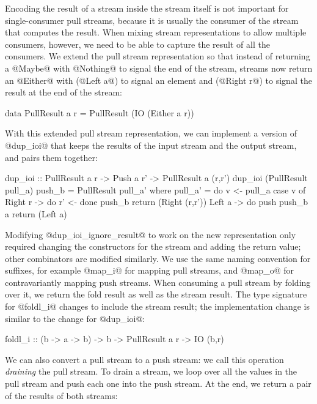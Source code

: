 Encoding the result of a stream inside the stream itself is not important for single-consumer pull streams, because it is usually the consumer of the stream that computes the result.
When mixing stream representations to allow multiple consumers, however, we need to be able to capture the result of all the consumers.
We extend the pull stream representation so that instead of returning a @Maybe@ with @Nothing@ to signal the end of the stream, streams now return an @Either@ with (@Left a@) to signal an element and (@Right r@) to signal the result at the end of the stream:

\begin{haskell}
data PullResult a r = PullResult (IO (Either a r))
\end{haskell}

With this extended pull stream representation, we can implement a version of @dup_ioi@ that keeps the results of the input stream and the output stream, and pairs them together:

\begin{haskell}
dup_ioi :: PullResult a r -> Push a r' -> PullResult a (r,r')
dup_ioi (PullResult pull_a) push_b = PullResult pull_a'
 where
  pull_a' = do
    v <- pull_a
    case v of
     Right r -> do
      r' <- done push_b
      return (Right (r,r'))
     Left a -> do
      push push_b a
      return (Left a)
\end{haskell}

Modifying @dup_ioi_ignore_result@ to work on the new representation only required changing the constructors for the stream and adding the return value; other combinators are modified similarly.
We use the same naming convention for suffixes, for example @map_i@ for mapping pull streams, and @map_o@ for contravariantly mapping push streams.
When consuming a pull stream by folding over it, we return the fold result as well as the stream result.
The type signature for @foldl_i@ changes to include the stream result; the implementation change is similar to the change for @dup_ioi@:

\begin{haskell}
foldl_i :: (b -> a -> b) -> b -> PullResult a r -> IO (b,r)
\end{haskell}

We can also convert a pull stream to a push stream: we call this operation \emph{draining} the pull stream.
To drain a stream, we loop over all the values in the pull stream and push each one into the push stream.
At the end, we return a pair of the results of both streams:

